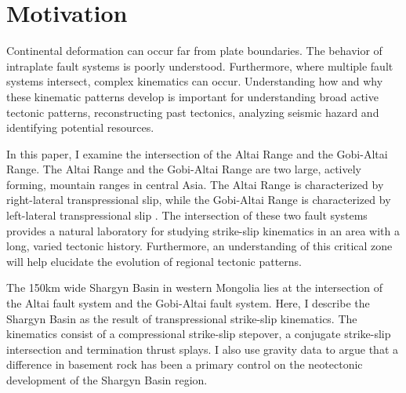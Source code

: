 \section{Motivation}
	Continental deformation can occur far from plate boundaries. The behavior of intraplate fault systems is poorly understood. Furthermore, where multiple fault systems intersect, complex kinematics can occur. Understanding how and why these kinematic patterns develop is important for understanding broad active tectonic patterns, reconstructing past tectonics, analyzing seismic hazard and identifying potential resources. 

	In this paper, I examine the intersection of the Altai Range and the Gobi-Altai Range. The Altai Range and the Gobi-Altai Range are two large, actively forming, mountain ranges in central Asia. The Altai Range is characterized by right-lateral transpressional slip, while the Gobi-Altai Range is characterized by left-lateral transpressional slip \citep{Cunningham2005a}\citep{Cunningham2010}. The intersection of these two fault systems provides a natural laboratory for studying strike-slip kinematics in an area with a long, varied tectonic history. Furthermore, an understanding of this critical zone will help elucidate the evolution of regional tectonic patterns.

	The 150km wide Shargyn Basin in western Mongolia lies at the intersection of the Altai fault system and the Gobi-Altai fault system. Here, I describe the Shargyn Basin as the result of transpressional strike-slip kinematics. The kinematics consist of a compressional strike-slip stepover, a conjugate strike-slip intersection and termination thrust splays. I also use gravity data to argue that a difference in basement rock has been a primary control on the neotectonic development of the Shargyn Basin region.


